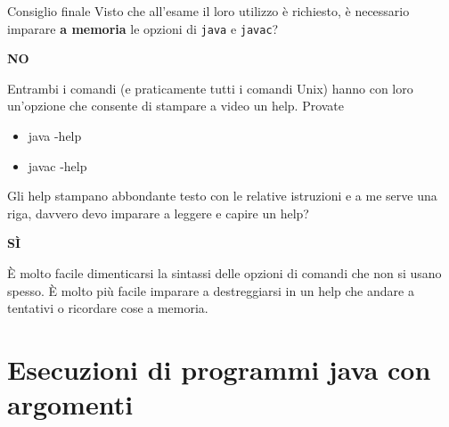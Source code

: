 \documentclass[xcolor=dvipsnames,presentation]{beamer}
\begin{document}
\begin{frame}{Consiglio finale}
  Visto che all'esame il loro utilizzo è richiesto, è necessario imparare \textbf{a memoria} le opzioni di \texttt{java} e \texttt{javac}?
  \begin{center}
    \textbf{NO}
  \end{center}
  Entrambi i comandi (e praticamente tutti i comandi Unix) hanno con loro un'opzione che consente di stampare a video un help. Provate
  \begin{block}{}
    \begin{itemize}
      \item java -help
      \item javac -help
    \end{itemize}
  \end{block}
  \vspace{10pt}

  Gli help stampano abbondante testo con le relative istruzioni e a me serve una riga, davvero devo imparare a leggere e capire un help?
  \begin{center}
    \textbf{SÌ}
  \end{center}
  È molto facile dimenticarsi la sintassi delle opzioni di comandi che non si usano spesso. È molto più facile imparare a destreggiarsi in un help che andare a tentativi o ricordare cose a memoria.
\end{frame}

\section{Esecuzioni di programmi java con argomenti}
\end{document}
